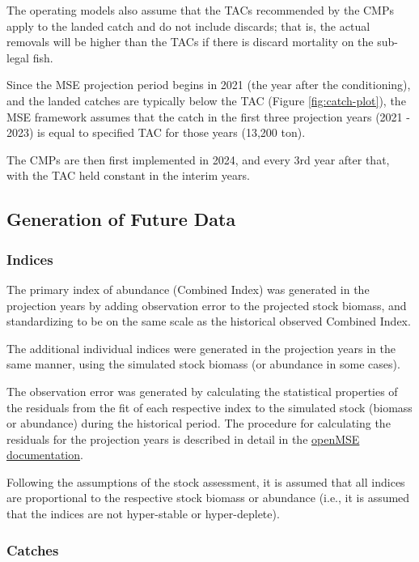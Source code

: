 \documentclass[
]{article}
\begin{document}
The operating models also assume that the TACs recommended by the CMPs apply to the landed catch and do not include discards; that is, the actual removals will be higher than the TACs if there is discard mortality on the sub-legal fish.

Since the MSE projection period begins in 2021 (the year after the conditioning), and the landed catches are typically below the TAC (Figure \ref{fig:catch-plot}), the MSE framework assumes that the catch in the first three projection years (2021 - 2023) is equal to specified TAC for those years (13,200 ton).

The CMPs are then first implemented in 2024, and every 3rd year after that, with the TAC held constant in the interim years.

\hypertarget{generation-of-future-data}{%
\subsection{Generation of Future Data}\label{generation-of-future-data}}

\hypertarget{indices}{%
\subsubsection{Indices}\label{indices}}

The primary index of abundance (Combined Index) was generated in the projection years by adding observation error to the projected stock biomass, and standardizing to be on the same scale as the historical observed Combined Index.

The additional individual indices were generated in the projection years in the same manner, using the simulated stock biomass (or abundance in some cases).

The observation error was generated by calculating the statistical properties of the residuals from the fit of each respective index to the simulated stock (biomass or abundance) during the historical period. The procedure for calculating the residuals for the projection years is described in detail in the \href{https://openmse.com/features-conditioning-oms/indices/}{openMSE documentation}.

Following the assumptions of the stock assessment, it is assumed that all indices are proportional to the respective stock biomass or abundance (i.e., it is assumed that the indices are not hyper-stable or hyper-deplete).

\hypertarget{catches}{%
\subsubsection{Catches}\label{catches}}
\end{document}
